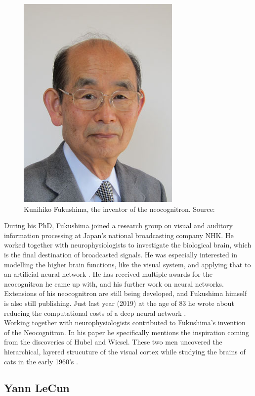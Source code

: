 \documentclass{article}
\begin{document}
\begin{figure}
    \centering
    \includegraphics{images/Fukushima.jpg}
    \caption{Kunihiko Fukushima, the inventor of the neocognitron. Source: \cite{fuzzy}}
    \label{fig:fuku}
\end{figure}

During his PhD, Fukushima joined a research group on visual and auditory information processing at Japan's national broadcasting company NHK. He worked together with neurophysiologists to investigate the biological brain, which is the final destination of broadcasted signals. He was especially interested in modelling the higher brain functions, like the visual system, and applying that to an artificial neural network \cite{fuzzy}. He has received multiple awards for the neocognitron he came up with, and his further work on neural networks.  Extensions of his neocognitron are still being developed, and Fukushima himself is also still publishing. Just last year (2019) at the age of 83 he wrote about reducing the computational costs of a deep neural network \cite{83}.\\

Working together with neurophysiologists contributed to Fukushima's invention of the Neocognitron. In his paper \cite{neocog} he specifically mentions the inspiration coming from the discoveries of Hubel and Wiesel. These two men uncovered the hierarchical, layered strucuture of the visual cortex while studying the brains of cats in the early 1960's \cite{hubel, wiesel}.


\subsection{Yann LeCun}
\end{document}
